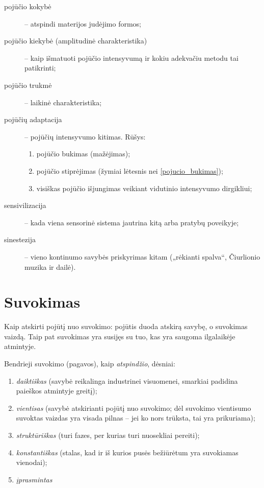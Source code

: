 \begin{description}
  \item[pojūčio kokybė] – atspindi materijos judėjimo formos;
  \item[pojūčio kiekybė (amplitudinė charakteristika)] – kaip išmatuoti
    pojūčio intensyvumą ir kokiu adekvačiu metodu tai patikrinti;
  \item[pojūčio trukmė] – laikinė charakteristika;
  \item[pojūčių adaptacija] – pojūčių intensyvumo kitimas. Rūšys:
    \begin{enumerate}
      \item \label{pojucio_bukimas} pojūčio bukimas (mažėjimas);
      \item pojūčio stiprėjimas (žymiai lėtesnis nei \ref{pojucio_bukimas});
      \item visiškas pojūčio išjungimas veikiant vidutinio intensyvumo
        dirgikliui;
    \end{enumerate}
  \item[sensivilizacija] – kada viena sensorinė sistema jautrina kitą arba 
    pratybų poveikyje;
  \item[sinestezija] – vieno kontinumo savybės priskyrimas kitam 
    („rėkianti spalva“, Čiurlionio muzika ir dailė).
\end{description}

\section{Suvokimas}

Kaip atskirti pojūtį nuo suvokimo: pojūtis duoda atskirą savybę, o 
suvokimas vaizdą. Taip pat suvokimas yra susijęs su tuo, kas yra
saugoma ilgalaikėje atmintyje.

Bendrieji suvokimo (pagavos), kaip \emph{atspindžio}, dėsniai:

\begin{enumerate}
  \item \emph{daiktiškas} (savybė reikalinga industrinei visuomenei, 
    smarkiai padidina paieškos atmintyje greitį);
  \item \emph{vientisas} (savybė atskirianti pojūtį nuo suvokimo; dėl
    suvokimo vientisumo suvoktas vaizdas yra visada pilnas – jei ko nors
    trūksta, tai yra prikuriama);
  \item \emph{struktūriškas} (turi fazes, per kurias turi nuosekliai
    pereiti);
  \item \emph{konstantiškas} (stalas, kad ir iš kurios pusės bežiūrėtum
    yra suvokiamas vienodai);
  \item \emph{įprasmintas} %
\end{enumerate}

